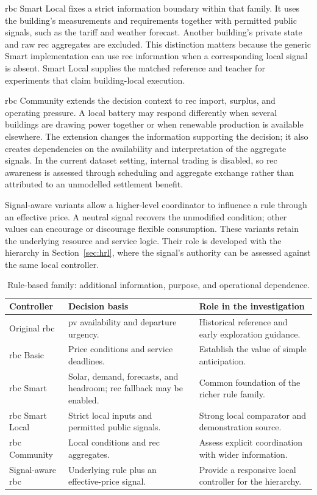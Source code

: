 \gls{rbc} Smart Local fixes a strict information boundary within that family. It uses the building's measurements and requirements together with permitted public signals, such as the tariff and weather forecast. Another building's private state and raw \gls{rec} aggregates are excluded. This distinction matters because the generic Smart implementation can use \gls{rec} information when a corresponding local signal is absent. Smart Local supplies the matched reference and teacher for experiments that claim building-local execution.

\gls{rbc} Community extends the decision context to \gls{rec} import, surplus, and operating pressure. A local battery may respond differently when several buildings are drawing power together or when renewable production is available elsewhere. The extension changes the information supporting the decision; it also creates dependencies on the availability and interpretation of the aggregate signals. In the current dataset setting, internal trading is disabled, so \gls{rec} awareness is assessed through scheduling and aggregate exchange rather than attributed to an unmodelled settlement benefit.

Signal-aware variants allow a higher-level coordinator to influence a rule through an effective price. A neutral signal recovers the unmodified condition; other values can encourage or discourage flexible consumption. These variants retain the underlying resource and service logic. Their role is developed with the hierarchy in Section~\ref{sec:hrl}, where the signal's authority can be assessed against the same local controller.

\begin{table}[htbp]
\centering
\caption{Rule-based family: additional information, purpose, and operational dependence.}
\label{tab:control-rbc-ladder}
\small
\begin{tabularx}{\textwidth}{@{}p{}XX@{}}
\toprule
\textbf{Controller} & \textbf{Decision basis} & \textbf{Role in the investigation}\\
\midrule
Original \gls{rbc} & \gls{pv} availability and departure urgency. & Historical reference and early exploration guidance.\\
\addlinespace
\gls{rbc} Basic & Price conditions and service deadlines. & Establish the value of simple anticipation.\\
\addlinespace
\gls{rbc} Smart & Solar, demand, forecasts, and headroom; \gls{rec} fallback may be enabled. & Common foundation of the richer rule family.\\
\addlinespace
\gls{rbc} Smart Local & Strict local inputs and permitted public signals. & Strong local comparator and demonstration source.\\
\addlinespace
\gls{rbc} Community & Local conditions and \gls{rec} aggregates. & Assess explicit coordination with wider information.\\
\addlinespace
Signal-aware \gls{rbc} & Underlying rule plus an effective-price signal. & Provide a responsive local controller for the hierarchy.\\
\bottomrule
\end{tabularx}
\end{table}

